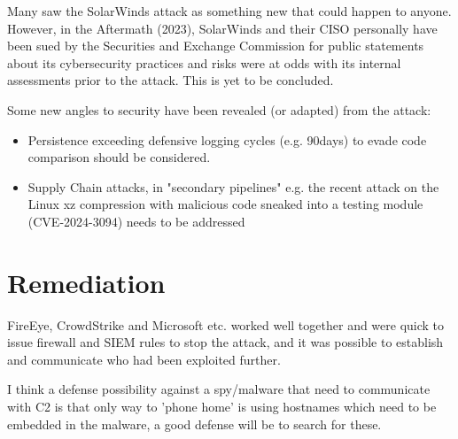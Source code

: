 \documentclass[
	letterpaper, %
	10pt, %
	unnumberedsections, %
	twoside, %
]{LTJournalArticle}
\begin{document}
Many saw the SolarWinds attack as something new that could happen to anyone. However, in the Aftermath (2023), SolarWinds and their CISO personally have been sued by the Securities and Exchange Commission\cite{SECLawsuit} for public statements about its cybersecurity practices and risks were at odds with its internal assessments prior to the attack. This is yet to be concluded.

Some new angles to security have been revealed (or adapted) from the attack:
\begin{itemize}
	\item Persistence exceeding defensive logging cycles (e.g. 90days) to evade code comparison should be considered.
	\item Supply Chain attacks, in "secondary pipelines" e.g. the recent attack on the Linux xz compression with malicious code sneaked into a testing module (CVE-2024-3094\cite{NISTCVE20243094}) needs to be addressed
\end{itemize}


\section{Remediation} 
FireEye, CrowdStrike and Microsoft etc. worked well together and were quick to issue firewall and SIEM rules to stop the attack, and it was possible to establish and communicate who had been exploited further. 

I think a defense possibility against a spy/malware that need to communicate with C2 is that only way to 'phone home' is using hostnames which need to be embedded in the malware, a good defense will be to search for these. 

\printbibliography %



\end{document}
